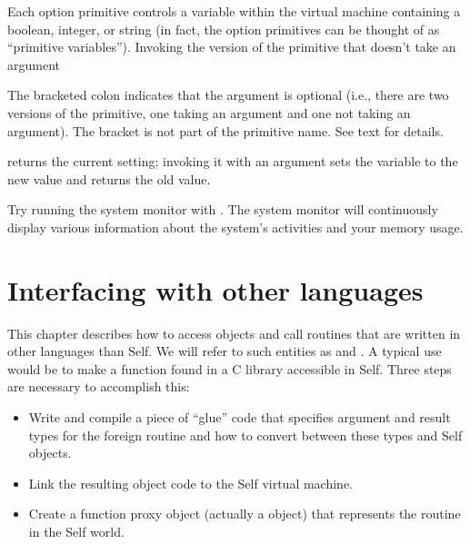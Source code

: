 \documentclass[letterpaper,10pt,english]{sphinxmanual}
\begin{document}
Each option primitive controls a variable within the virtual machine containing a boolean, integer,
or string (in fact, the option primitives can be thought of as “primitive variables”). Invoking the
version of the primitive that doesn’t take an argument %
\begin{footnote}[1]\sphinxAtStartFootnote
The bracketed colon indicates that the argument is optional (i.e., there are two versions of the primitive, one taking an argument and one not taking an argument). The bracket is not part of the primitive name. See text for details.
%
\end{footnote} returns the current setting; invoking it with
an argument sets the variable to the new value and returns the old value.

Try running the system monitor with . The system monitor will continuously display
various information about the system’s activities and your memory usage.

\newpage

\section{Interfacing with other languages}
\label{\detokenize{vmref:interfacing-with-other-languages}}
This chapter describes how to access objects and call routines that are written in other languages
than Self. We will refer to such entities as  and . A typical use
would be to make a function found in a C library accessible in Self. Three steps are necessary to
accomplish this:
\begin{itemize}
\item {} 
Write and compile a piece of “glue” code that specifies argument and result types for the foreign routine and how to convert between these types and Self objects.

\item {} 
Link the resulting object code to the Self virtual machine.

\item {} 
Create a function proxy object (actually a  object) that represents the routine in the Self world.

\end{itemize}
\end{document}
